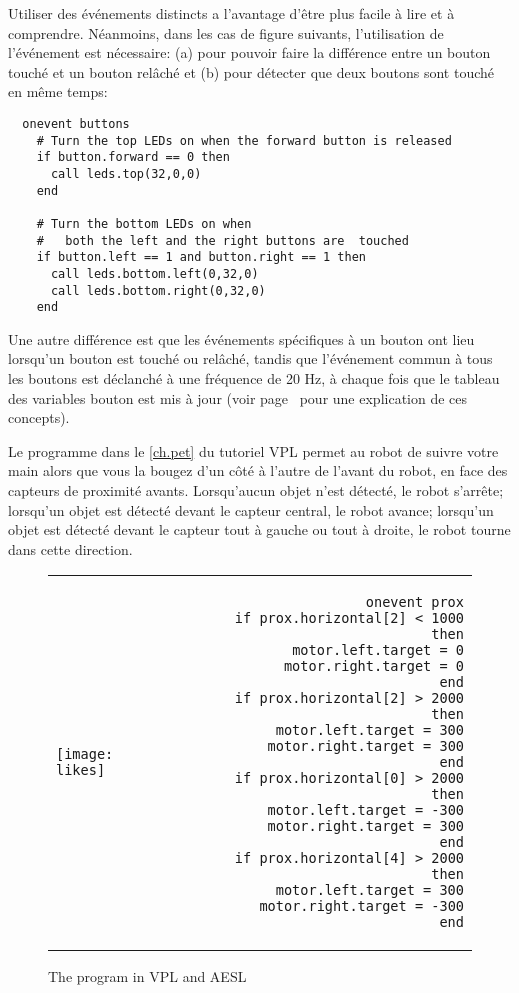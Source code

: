 Utiliser des événements distincts a l'avantage d'être plus facile à lire et à comprendre.
Néanmoins, dans les cas de figure suivants, l'utilisation de l'événement  est nécessaire:
(a) pour pouvoir faire la différence entre un bouton touché et un bouton relâché
et
(b) pour détecter que deux boutons sont touché en même temps:

\begin{footnotesize}
\begin{verbatim}
  onevent buttons
    # Turn the top LEDs on when the forward button is released
    if button.forward == 0 then
      call leds.top(32,0,0)
    end

    # Turn the bottom LEDs on when
    #   both the left and the right buttons are  touched
    if button.left == 1 and button.right == 1 then
      call leds.bottom.left(0,32,0)
      call leds.bottom.right(0,32,0)
    end
\end{verbatim}
\end{footnotesize}

Une autre différence est que les événements spécifiques à un bouton
ont lieu lorsqu'un bouton est touché ou relâché,
tandis que l'événement commun à tous les boutons est déclanché à une fréquence de 20 Hz,
à chaque fois que le tableau des variables bouton est mis à jour (voir page~\pageref{pg.hz}
pour une explication de ces concepts).


Le programme  dans le \cref{ch.pet} du tutoriel VPL
permet au robot de suivre votre main alors que vous la bougez d'un côté à l'autre de l'avant du robot,
en face des capteurs de proximité avants.
Lorsqu'aucun objet n'est détecté, le robot s'arrête;
lorsqu'un objet est détecté devant le capteur central, le robot avance;
lorsqu'un objet est détecté devant le capteur tout à gauche ou tout à droite,
le robot tourne dans cette direction.

\begin{figure}[hbt]
\begin{center}
\begin{tabular}{lr}
\texttt{[image: likes]} &
\begin{minipage}[b]{.4\textwidth}
\begin{footnotesize}
\begin{verbatim}
  onevent prox
    if prox.horizontal[2] < 1000 then
      motor.left.target = 0
      motor.right.target = 0
    end
    if prox.horizontal[2] > 2000 then
      motor.left.target = 300
      motor.right.target = 300
    end
    if prox.horizontal[0] > 2000 then
      motor.left.target = -300
      motor.right.target = 300
    end
    if prox.horizontal[4] > 2000 then
      motor.left.target = 300
      motor.right.target = -300
    end
\end{verbatim}
\end{footnotesize}
\end{minipage}
\end{tabular}
\caption{The  program in VPL and AESL}\label{fig.arrays}
\end{center}
\end{figure}

